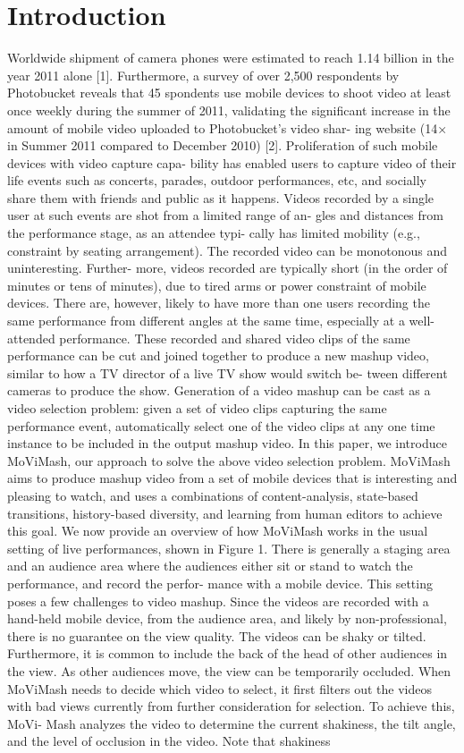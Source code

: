 \documentclass{sig-alternate}
\begin{document}
\section{Introduction}
Worldwide shipment of camera phones were estimated to reach
1.14 billion in the year 2011 alone [1]. Furthermore, a survey of
over 2,500 respondents by Photobucket reveals that 45%
spondents use mobile devices to shoot video at least once weekly
during the summer of 2011, validating the significant increase in
the amount of mobile video uploaded to Photobucket’s video shar-
ing website (14× in Summer 2011 compared to December 2010) [2].
Proliferation of such mobile devices with video capture capa-
bility has enabled users to capture video of their life events such
as concerts, parades, outdoor performances, etc, and socially share
them with friends and public as it happens. Videos recorded by
a single user at such events are shot from a limited range of an-
gles and distances from the performance stage, as an attendee typi-
cally has limited mobility (e.g., constraint by seating arrangement).
The recorded video can be monotonous and uninteresting. Further-
more, videos recorded are typically short (in the order of minutes
or tens of minutes), due to tired arms or power constraint of mobile
devices. There are, however, likely to have more than one users
recording the same performance from different angles at the same
time, especially at a well-attended performance.
These recorded and shared video clips of the same performance
can be cut and joined together to produce a new mashup video,
similar to how a TV director of a live TV show would switch be-
tween different cameras to produce the show. Generation of a video
mashup can be cast as a video selection problem: given a set of
video clips capturing the same performance event, automatically
select one of the video clips at any one time instance to be included
in the output mashup video.
In this paper, we introduce MoViMash, our approach to solve
the above video selection problem. MoViMash aims to produce
mashup video from a set of mobile devices that is interesting and
pleasing to watch, and uses a combinations of content-analysis,
state-based transitions, history-based diversity, and learning from
human editors to achieve this goal.
We now provide an overview of how MoViMash works in the
usual setting of live performances, shown in Figure 1. There is
generally a staging area and an audience area where the audiences
either sit or stand to watch the performance, and record the perfor-
mance with a mobile device. This setting poses a few challenges to
video mashup.
Since the videos are recorded with a hand-held mobile device,
from the audience area, and likely by non-professional, there is no
guarantee on the view quality. The videos can be shaky or tilted.
Furthermore, it is common to include the back of the head of other
audiences in the view. As other audiences move, the view can be
temporarily occluded. When MoViMash needs to decide which
video to select, it first filters out the videos with bad views currently
from further consideration for selection. To achieve this, MoVi-
Mash analyzes the video to determine the current shakiness, the tilt
angle, and the level of occlusion in the video. Note that shakiness
\end{document}
